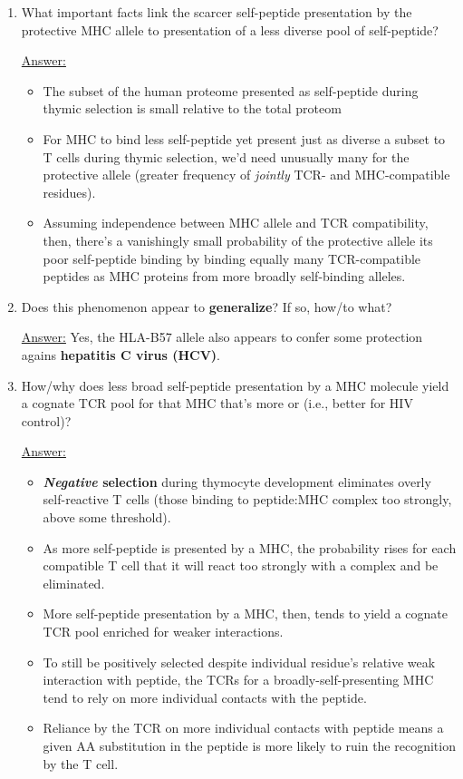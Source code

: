 \documentclass{article}
\newenvironment{QandA}{\begin{enumerate}[label=\bfseries Q\arabic*.]}
                       {\end{enumerate}}
\newenvironment{answered}{\par\normalfont\underline{Answer:}}{}
\begin{document}
\begin{QandA}
  \item{What important facts link the scarcer self-peptide presentation by the protective MHC allele to presentation of a less diverse pool of self-peptide?}
    \begin{answered}
    \begin{itemize}
      \item{The subset of the human proteome presented as self-peptide during thymic selection is small relative to the total proteom}
      \item{For MHC to bind less self-peptide yet present just as diverse a subset to T cells during thymic selection, we'd need unusually many  for the protective allele (greater frequency of \textit{jointly} TCR- and MHC-compatible residues).}
      \item{Assuming independence between MHC allele and TCR compatibility, then, there's a vanishingly small probability of the protective allele  its poor self-peptide binding by binding equally many TCR-compatible peptides as MHC proteins from more broadly self-binding alleles.}
    \end{itemize}
    \end{answered}
  \item{Does this  phenomenon appear to \textbf{generalize}? If so, how/to what?}
    \begin{answered}
    Yes, the HLA-B57 allele also appears to confer some protection agains \textbf{hepatitis C virus (HCV)}.
    \end{answered}
  \item{How/why does less broad self-peptide presentation by a MHC molecule yield a cognate TCR pool for that MHC that's more  or  (i.e., better for HIV control)?}
    \begin{answered}
    \begin{itemize}
      \item{\textbf{\textit{Negative} selection} during thymocyte development eliminates overly self-reactive T cells (those binding to peptide:MHC complex too strongly, above some threshold).}
      \item{As more self-peptide is presented by a MHC, the probability rises for each compatible T cell that it will react too strongly with a complex and be eliminated.}
      \item{More self-peptide presentation by a MHC, then, tends to yield a cognate TCR pool enriched for weaker interactions.}
      \item{To still be positively selected despite individual residue's relative weak interaction with peptide, the TCRs for a broadly-self-presenting MHC tend to rely on more individual contacts with the peptide.}
      \item{Reliance by the TCR on more individual contacts with peptide means a given AA substitution in the peptide is more likely to ruin the recognition by the T cell.}
    \end{itemize}
    \end{answered}
\end{QandA}
\end{document}
